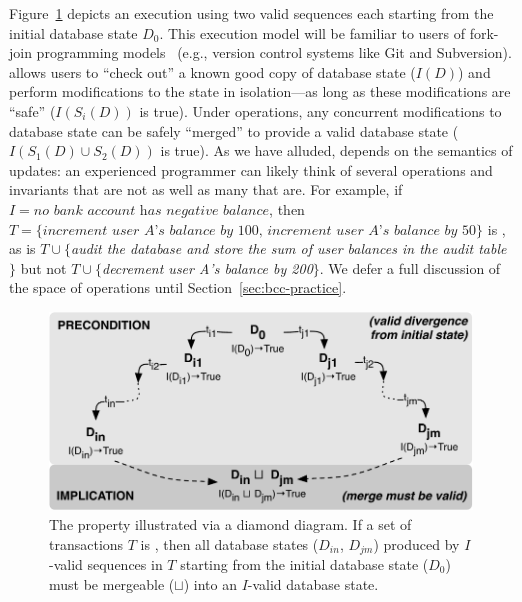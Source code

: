 Figure~\ref{fig:iconfluence} depicts an \iconfluent execution using
two valid sequences each starting from the initial database state
$D_0$. This execution model will be familiar to users of fork-join
programming models~\cite{hewitt-forkjoin} (e.g., version control
systems like Git and Subversion). \iconfluence allows users to ``check
out'' a known good copy of database state ($I(D)$) and perform
modifications to the state in isolation---as long as these
modifications are ``safe'' ($I(S_i(D))$ is true). Under \iconfluent
operations, any concurrent modifications to database state can be
safely ``merged'' to provide a valid database state ($I(S_1(D) \cup
S_2(D))$ is true). As we have alluded, \iconfluence depends on the
semantics of updates: an experienced programmer can likely think of
several operations and invariants that are not \iconfluent as well as
many that are. For example, if $I=\textit{no bank account has negative
  balance}$, then $T=\{\textit{increment user A's balance by 100,
  increment user A's balance by 50}\}$ is \iconfluent, as is
$T\cup\{$\textit{audit the database and store the sum of user balances
  in the \textrm{audit} table}$\}$ but not $T\cup\{$\textit{decrement
  user A's balance by 200}$\}$. We defer a full discussion of the
space of operations until Section~\ref{sec:bcc-practice}.

\begin{figure}
\begin{center}
\includegraphics[width=\columnwidth]{figs/icommute.pdf}\vspace{-1em}
\end{center}
\caption{The \iconfluence property illustrated via a diamond
  diagram. If a set of transactions $T$ is \iconfluent, then all
  database states ($D_{in}$, $D_{jm}$) produced by $I$-valid sequences
  in $T$ starting from the initial database state ($D_0$) must be
  mergeable ($\sqcup$) into an $I$-valid database state.}
\label{fig:iconfluence}
\end{figure}

